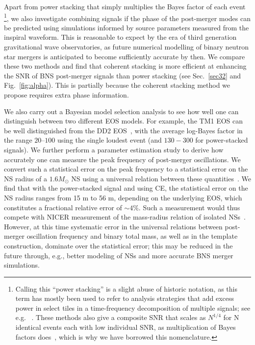 \documentclass[prd,aps,floatfix,superscriptaddress,nofootinbib,twocolumn,10pt,English]{revtex4-1}
\begin{document}
Apart from power stacking that
simply multiplies the Bayes factor of each
event~\cite{Agathos:2013upa,PhysRevD.90.064009,Agathos:2015uaa}
\footnote{Calling this ``power stacking'' is
  a slight abuse of historic notation, as this term has mostly been
  used to refer to analysis strategies that add excess power in select
  tiles in a time-frequency decomposition of multiple signals; see
  e.g. ~\cite{Kalmus:2009uk,Tai:2014bfa}. These methods also give a
  composite SNR that scales as $N^{1/4}$ for N identical events each
  with low individual SNR, as multiplication of Bayes factors
  does~\cite{yang2017black}, which is why we have borrowed this
  nomenclature.}, we also investigate combining signals if the phase of the post-merger 
modes can be predicted using simulations informed by source parameters measured
from the inspiral waveform. This is reasonable to expect by the era of third generation
gravitational wave observatories, as future numerical modelling
of binary neutron star mergers is anticipated to become sufficiently
accurate by then. We compare these two methods and find that coherent stacking
is more efficient at enhancing the SNR of BNS post-merger signals than
power stacking (see Sec.~\ref{sec32} and Fig.~\ref{fig:alpha}).  This
is partially because the coherent stacking method we propose requires
extra phase information.


We also carry out a Bayesian model selection analysis to see how well
one can distinguish between two different EOS models. For example, the
TM1 EOS can be well distinguished from the DD2
EOS~\cite{Hempel:2011mk}, with the average log-Bayes factor in the
range $20$--$100$ using the single loudest event (and $130-300$ for power-stacked signals).  
We further perform a parameter
estimation study to derive how accurately one can measure the peak
frequency of post-merger oscillations. We convert such a statistical
error on the peak frequency to a statistical error on the NS radius of
a $1.6M_\odot$ NS using a universal relation between these
quantities~\cite{bauswein2015exploring}.  We find that with the
power-stacked  signal and using CE, the statistical error on the NS radius
ranges from 15 m to 56 m, depending on the underlying EOS, which
constitutes a fractional relative error of $\sim 4\%$. Such a
measurement would thus compete with NICER measurement of the
mass-radius relation of isolated NSs~\cite{2012SPIE.8443E..13G}.
However, at this time systematic error in the universal relations
between post-merger oscillation frequency and binary total mass, as
well as in the template construction, dominate over the statistical
error; this may be reduced in the future through, e.g., better
modeling of NSs and more accurate BNS merger simulations.
\end{document}
